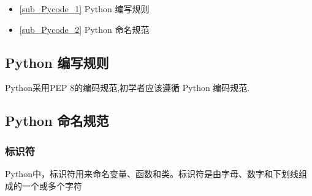 
\begin{itemize}
\item \autoref{sub_Pycode_1} Python 编写规则
\item \autoref{sub_Pycode_2} Python 命名规范
\end{itemize}

\subsection{Python 编写规则}\label{sub_Pycode_1}

Python采用PEP 8的编码规范,初学者应该遵循 Python 编码规范.

\subsection{Python 命名规范}\label{sub_Pycode_2}
\subsubsection{标识符}
Python中，标识符用来命名变量、函数和类。标识符是由字母、数字和下划线组成的一个或多个字符


